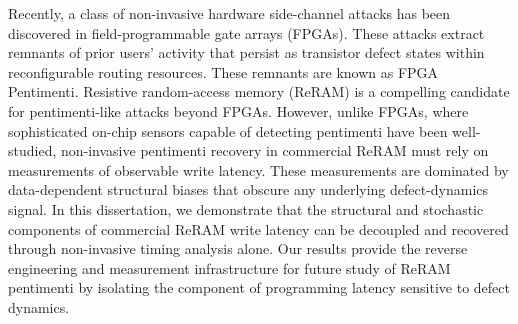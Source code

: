 
Recently, a class of non-invasive hardware side-channel attacks has been
discovered in field-programmable gate arrays (FPGAs). These attacks
extract remnants of prior users' activity that persist as transistor
defect states within reconfigurable routing resources. These remnants
are known as FPGA Pentimenti. Resistive random-access memory (ReRAM) is
a compelling candidate for pentimenti-like attacks beyond FPGAs.
However, unlike FPGAs, where sophisticated on-chip sensors capable of
detecting pentimenti have been well-studied, non-invasive pentimenti
recovery in commercial ReRAM must rely on measurements of observable
write latency. These measurements are dominated by data-dependent
structural biases that obscure any underlying defect-dynamics signal. In
this dissertation, we demonstrate that the structural and stochastic
components of commercial ReRAM write latency can be decoupled and
recovered through non-invasive timing analysis alone. Our results
provide the reverse engineering and measurement infrastructure for
future study of ReRAM pentimenti by isolating the component of
programming latency sensitive to defect dynamics.